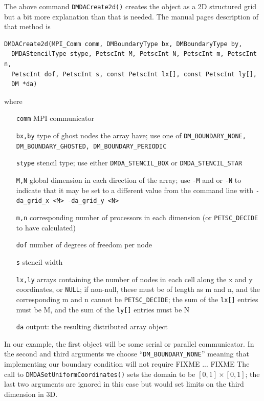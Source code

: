 The above command \texttt{DMDACreate2d()} creates the \pDMDA object as a 2D structured grid but a bit more explanation than that is needed.   The \PETSc manual pages description of that method is
\begin{Verbatim}[fontsize=\small]
DMDACreate2d(MPI_Comm comm, DMBoundaryType bx, DMBoundaryType by,
  DMDAStencilType stype, PetscInt M, PetscInt N, PetscInt m, PetscInt n,
  PetscInt dof, PetscInt s, const PetscInt lx[], const PetscInt ly[],
  DM *da)
\end{Verbatim}
where
\small
\begin{itemize}[align=left]
\item[\texttt{comm}]   MPI communicator \\
\item[\texttt{bx,by}]  type of ghost nodes the array have; use one of \texttt{DM\_BOUNDARY\_NONE, DM\_BOUNDARY\_GHOSTED, DM\_BOUNDARY\_PERIODIC} \\
\item[\texttt{stype}] stencil type; use either \texttt{DMDA\_STENCIL\_BOX} or \texttt{DMDA\_STENCIL\_STAR} \\
\item[\texttt{M,N}]	   global dimension in each direction of the array; use \texttt{-M} and or \texttt{-N} to indicate that it may be set to a different value from the command line with \texttt{-da\_grid\_x <M> -da\_grid\_y <N>} \\
\item[\texttt{m,n}]   corresponding number of processors in each dimension (or \texttt{PETSC\_DECIDE} to have calculated) \\
\item[\texttt{dof}]     number of degrees of freedom per node \\
\item[\texttt{s}]       stencil width \\
\item[\texttt{lx,ly}]  arrays containing the number of nodes in each cell along the x and y coordinates, or \texttt{NULL}; if non-null, these must be of length as m and n, and the corresponding m and n cannot be \texttt{PETSC\_DECIDE}; the sum of the \texttt{lx[]} entries must be M, and the sum of the \texttt{ly[]} entries must be N \\
\item[\texttt{da}]      output: the resulting distributed array object 
\end{itemize}
\normalsize
In our example, the first object will be some serial or parallel \MPI communicator.  In the second and third arguments we choose ``\texttt{DM\_BOUNDARY\_NONE}'' meaning that implementing our boundary condition will not require FIXME ... FIXME  The call to \texttt{DMDASetUniformCoordinates()} sets the domain to be $[0,1]\times[0,1]$; the last two arguments are ignored in this case but would set limits on the third dimension in 3D.


